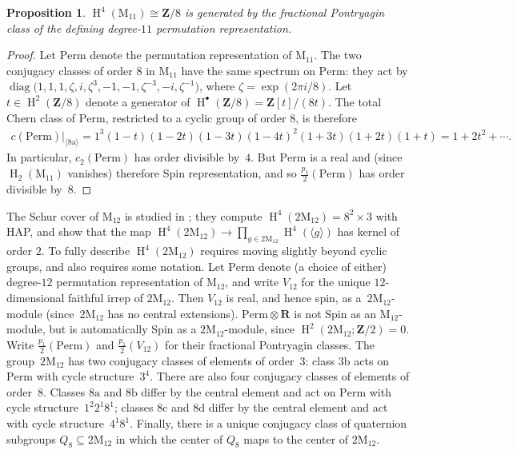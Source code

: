 \documentclass[pdftex]{sigma}
\numberwithin{equation}{section}
\newtheorem{Proposition}[Theorem]{Proposition}
 { \theoremstyle{definition}
\newtheorem{Remark}[Theorem]{Remark} }
\newcommand\bR{\mathbf R}
\newcommand\bZ{\mathbf Z}
\newcommand\ra{\mathrm a}
\newcommand\rb{\mathrm b}
\newcommand\rc{\mathrm c}
\newcommand\rd{\mathrm d}
\newcommand\rM{\mathrm M}
\DeclareMathOperator\homology{H}
\renewcommand\H{\homology}
\newcommand\<\langle
\renewcommand\>\rangle
\newcommand\Perm{\mathrm{Perm}}
\begin{document}
\begin{Proposition} $\H^4(\rM_{11}) \cong \bZ/8$ is generated by the fractional Pontryagin class of the defining degree-$11$ permutation representation.
\end{Proposition}
\begin{proof} Let $\Perm$ denote the permutation representation of $\rM_{11}$. The two conjugacy classes of order $8$ in $\rM_{11}$ have the same spectrum on $\Perm$: they act by $\operatorname{diag}\big(1,1,1,\zeta,i,\zeta^3,-1,-1,\zeta^{-3},-i,\allowbreak \zeta^{-1}\big)$, where $\zeta = \exp(2\pi i/8)$.
 Let $t \in \H^2(\bZ/8)$ denote a generator of $\H^\bullet(\bZ/8) = \bZ[t]/(8t)$.
 The total Chern class of $\Perm$, restricted to a cyclic group of order $8$, is therefore
 \begin{gather*} c(\Perm)|_{\langle 8\ra\rangle} = 1^3 (1-t)(1-2t)(1-3t)(1-4t)^2(1+3t)(1+2t)(1+t) = 1 + 2t^2 + \cdots.\end{gather*}
 In particular, $c_2(\Perm)$ has order divisible by~$4$. But $\Perm$ is a real and (since $\H_2(\rM_{11})$ vanishes) therefore Spin representation, and so $\frac{p_1}2(\Perm)$ has order divisible by~$8$.
\end{proof}

The Schur cover of $\rM_{12}$ is studied in \cite{CLW}; they compute $\H^4(2\rM_{12}) = 8^2 \times 3$ with HAP, and show that the map $\H^4(2\rM_{12}) \to \prod\limits_{g\in 2\rM_{12}} \H^4(\langle g\rangle)$ has kernel of order $2$. To fully describe $\H^4(2\rM_{12})$ requires moving slightly beyond cyclic groups, and also requires some notation. Let $\Perm$ denote (a choice of either) degree-$12$ permutation representation of $\rM_{12}$, and write $V_{12}$ for the unique $12$-dimensional faithful irrep of $2\rM_{12}$. Then $V_{12}$ is real, and hence spin, as a~$2\rM_{12}$-module (since~$2\rM_{12}$ has no central extensions). $\Perm \otimes \bR$ is not Spin as an $\rM_{12}$-module, but is automatically Spin as a $2\rM_{12}$-module, since $\H^2(2\rM_{12};\bZ/2) = 0$. Write $\frac{p_1}2(\Perm)$ and $\frac{p_1}2(V_{12})$ for their fractional Pontryagin classes. The group~$2\rM_{12}$ has two conjugacy classes of elements of order~$3$: class $3\rb$ acts on $\Perm$ with cycle structure~$3^{4}$. There are also four conjugacy classes of elements of order~$8$. Classes $8\ra$ and $8\rb$ differ by the central element and act on $\Perm$ with cycle structure~$1^2 2^1 8^1$; classes $8\rc$ and $8\rd$ differ by the central element and act with cycle structure~$4^1 8^1$. Finally, there is a unique conjugacy class of quaternion subgroups $Q_8 \subseteq 2\rM_{12}$ in which the center of $Q_8$ maps to the center of $2\rM_{12}$.
\end{document}
